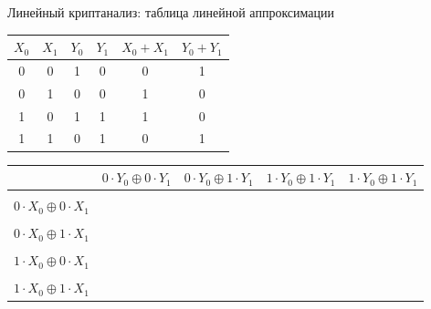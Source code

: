 \documentclass[usenames,dvipsnames,8pt,aspectratio=169]{beamer}
\begin{document}
\begin{frame}{Линейный криптанализ: таблица линейной аппроксимации }
\large

\begin{center}
\begin{tabular}{c | c | c | c | c | c }
	$X_0$ & $X_1$ & $Y_0$ & $Y_1$ & $X_0 + X_1 $ & $Y_0+Y_1$\\ \hline
	0 & 0 & 1 & 0 & 0 & 1 \\
	0 & 1 & 0 & 0 & 1 & 0\\
	1 & 0 & 1 & 1 & 1 & 0\\
	1 & 1 & 0 & 1 & 0 & 1\\ 
\end{tabular}
\end{center}

\vspace{5pt}


\begin{tabular}{c | c | c | c | c  }
	& \textbf{$0\cdot Y_0 \oplus 0\cdot Y_1 $} & \textbf{$0\cdot Y_0 \oplus 1\cdot Y_1 $} & \textbf{$1\cdot Y_0 \oplus 1\cdot Y_1 $} & \textbf{$1\cdot Y_0 \oplus 1\cdot Y_1 $} \\ \hline
	& & & &\\ 
	\textbf{$0\cdot X_0 \oplus 0\cdot X_1 $} & & & &\\  [8pt] \hline
	& & & &\\ 
	\textbf{$0\cdot X_0 \oplus 1\cdot X_1 $} & & & &\\  [8pt] \hline 
	& & & &\\ 
	\textbf{$1\cdot X_0 \oplus 0\cdot X_1 $} & & & &\\  [8pt] \hline 
	& & & &\\ 
	\textbf{$1\cdot X_0 \oplus 1\cdot X_1 $} & & & &\\  [8pt] 
\end{tabular}

\vspace{55pt}
\end{frame}
\end{document}
